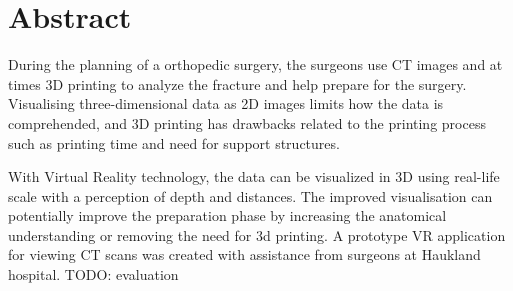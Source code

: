 \documentclass[a4paper]{report}
\begin{document}
%
%


\makeatletter
{}
\def\lst@SkipToFirst{%
    \lst@ifmatchrangestart\c@lstnumber=\numexpr-1+\lst@firstline\fi
    \ifnum \lst@lineno<\lst@firstline
        \def\lst@next{\lst@BeginDropInput\lst@Pmode
        \lst@Let{13}\lst@MSkipToFirst
        \lst@Let{10}\lst@MSkipToFirst}%
        \expandafter\lst@next
    \else
        \expandafter\lst@BOLGobble
    \fi}
\makeatother



\titlePage
\pagebreak

\section*{Abstract}

During the planning of a orthopedic surgery, the surgeons use CT images and at times 3D printing to analyze the fracture and help prepare for the surgery.
Visualising three-dimensional data as 2D images limits how the data is comprehended, and 3D printing has drawbacks related to the printing process such as printing time and need for support structures.

With Virtual Reality technology, the data can be visualized in 3D using real-life scale with a perception of depth and distances. The improved visualisation can potentially improve the preparation phase by increasing the anatomical understanding or removing the need for 3d printing.
A prototype VR application for viewing CT scans was created with assistance from surgeons at Haukland hospital.
TODO: evaluation
\end{document}
